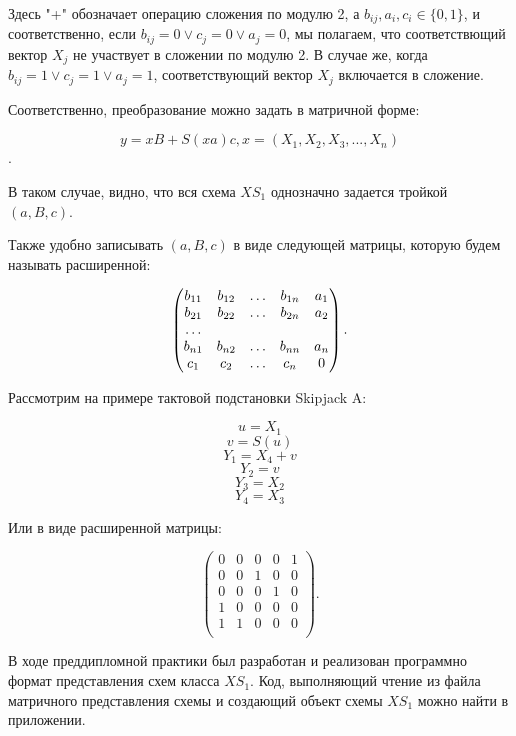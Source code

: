 Здесь "+" обозначает операцию сложения по модулю 2, а $b_{ij}, a_i, c_i \in \{0, 1\}$, и соответственно, если $b_{ij} = 0 \vee c_j=0 \vee a_j = 0$, мы полагаем, что соответствющий вектор $X_j$ не участвует в сложении по модулю 2. В случае же, когда $b_{ij} = 1 \vee c_j=1 \vee a_j = 1$, соответствующий вектор $X_j$ включается в сложение.

Соответственно, преобразование можно задать в матричной форме:

$$y = xB + S(xa)c, x = (X_1, X_2, X_3, ..., X_n)$$.

В таком случае, видно, что вся схема $XS_1$ однозначно задается тройкой $(a, B, c)$. 

Также удобно записывать $(a, B, c)$ в виде следующей матрицы, которую будем называть расширенной:

$$
\begin{pmatrix}
b_{11} & b_{12} & \ldots & b_{1n} & a_1\\
b_{21} & b_{22} & \ldots & b_{2n} & a_2\\
\dotfill\\
b_{n1} & b_{n2} & \ldots & b_{nn} & a_n\\
c_1    & c_2    & \ldots & c_n    & 0\\
\end{pmatrix}.
$$

Рассмотрим на примере тактовой подстановки Skipjack A:

$$u = X_1$$
$$v = S(u)$$
$$Y_1 = X_4 + v$$
$$Y_2 = v$$
$$Y_3 = X_2$$
$$Y_4 = X_3$$

Или в виде расширенной матрицы:

$$
\begin{pmatrix}
0 & 0 & 0 & 0 & 1\\
0 & 0 & 1 & 0 & 0\\
0 & 0 & 0 & 1 & 0\\
1 & 0 & 0 & 0 & 0\\
1    & 1    & 0 & 0    & 0\\
\end{pmatrix}.
$$

В ходе преддипломной практики был разработан и реализован программно формат представления схем класса $XS_1$. Код, выполняющий чтение из файла матричного представления схемы и создающий объект схемы $XS_1$ можно найти в приложении. 
